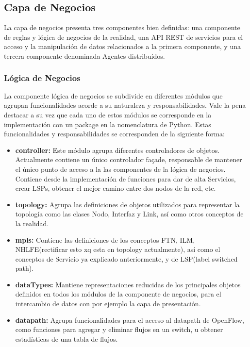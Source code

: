 \subsection{Capa de Negocios}
La capa de negocios presenta tres componentes bien definidas: una componente de reglas y l\'ogica de negocios de la realidad, una API REST de servicios para el acceso y la manipulaci\'on de datos relacionados a la primera componente, y una tercera componente denominada Agentes distribu\'idos.

\subsubsection{Lógica de Negocios}
La componente lógica de negocios se subdivide en diferentes m\'odulos que agrupan funcionalidades acorde a su naturaleza y responsabilidades. Vale la pena destacar a su vez que cada uno de estos m\'odulos se corresponde en la implementaci\'on con un package en la nomenclatura de Python. Estas funcionalidades y responsabilidades se corresponden de la siguiente forma:

\begin{itemize}
\item \textbf{controller:} Este m\'odulo agrupa diferentes controladores de objetos. Actualmente contiene un \'unico controlador façade, responsable de mantener el \'unico punto de acceso a la las componentes de la l\'ogica de negocios. Contiene desde la implementaci\'on de funciones para dar de alta Servicios, crear LSPs, obtener el mejor camino entre dos nodos de la red, etc.

\item \textbf{topology:} Agrupa las definiciones de objetos utilizados para representar la topolog\'ia como las clases Nodo, Interfaz y Link, así como otros conceptos de la realidad.
 
\item \textbf{mpls:} Contiene las definiciones de los conceptos FTN, ILM, NHLFE(rectificar esto xq esta en topology actualmente), as\'i como el conceptos de Servicio ya explicado anteriormente, y de LSP(label switched path).

\item \textbf{dataTypes:} Mantiene representaciones reducidas de los principales objetos definidos en todos los m\'odulos de la componente de negocios, para el intercambio de datos con por ejemplo la capa de presentaci\'on. 

\item \textbf{datapath:} Agrupa funcionalidades para el acceso al datapath de OpenFlow, como funciones para agregar y eliminar flujos en un switch, u obtener estad\'isticas de una tabla de flujos.
\end{itemize} 

